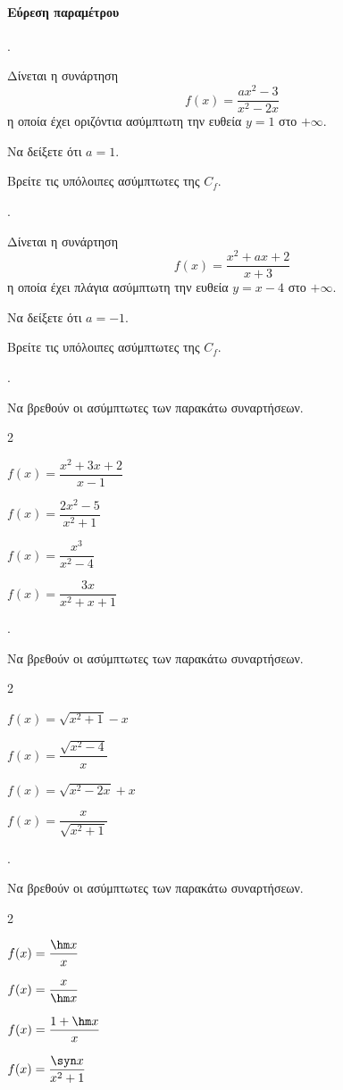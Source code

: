 \documentclass[11pt,a4paper,twocolumn]{article}
\newcounter{askhsh}
\newcommand{\askhsh}{\large\theaskhsh.\ \addtocounter{askhsh}{1}}
\begin{document}
\paragraph{Εύρεση παραμέτρου}
\askhsh Δίνεται η συνάρτηση \[f(x)=\dfrac{ax^2-3}{x^2-2x}\] η οποία έχει οριζόντια ασύμπτωτη την ευθεία $y=1$ στο $+\infty$.
\begin{alist}
\item Να δείξετε ότι $a=1$.
\item Βρείτε τις υπόλοιπες ασύμπτωτες της $C_f$.
\end{alist}
\askhsh Δίνεται η συνάρτηση \[f(x)=\dfrac{x^2+ax+2}{x+3}\] η οποία έχει πλάγια ασύμπτωτη την ευθεία $y=x-4$ στο $+\infty$.
\begin{alist}
\item Να δείξετε ότι $a=-1$.
\item Βρείτε τις υπόλοιπες ασύμπτωτες της $C_f$.
\end{alist}
\askhsh Να βρεθούν οι ασύμπτωτες των παρακάτω συναρτήσεων.
\begin{multicols}{2}
\begin{alist}
\item $f(x)=\dfrac{x^2+3x+2}{x-1}$
\item $f(x)=\dfrac{2x^2-5}{x^2+1}$
\item $f(x)=\dfrac{x^3}{x^2-4}$
\item $f(x)=\dfrac{3x}{x^2+x+1}$
\end{alist}
\end{multicols}
\askhsh Να βρεθούν οι ασύμπτωτες των παρακάτω συναρτήσεων.
\begin{multicols}{2}
\begin{alist}
\item $f(x)=\sqrt{x^2+1}-x$
\item $f(x)=\dfrac{\sqrt{x^2-4}}{x}$
\item $f(x)=\sqrt{x^2-2x}+x$
\item $f(x)=\dfrac{x}{\sqrt{x^2+1}}$
\end{alist}
\end{multicols}
\askhsh Να βρεθούν οι ασύμπτωτες των παρακάτω συναρτήσεων.
\begin{multicols}{2}
\begin{alist}
\item $f(x)=\dfrac{\hm x}{x}$
\item $f(x)=\dfrac{x}{\hm x}$
\item $f(x)=\dfrac{1+\hm x}{x}$
\item $f(x)=\dfrac{\syn x}{x^2+1}$
\end{alist}
\end{multicols}
\end{document}
